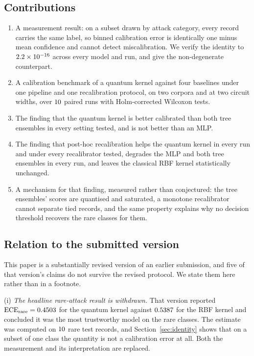 \documentclass[journal]{IEEEtran}
\begin{document}
\subsection*{Contributions}
\begin{enumerate}
  \item A measurement result: on a subset drawn by attack category, every
        record carries the same label, so binned calibration error is
        identically one minus mean confidence and cannot detect
        miscalibration. We verify the identity to $2.2\times10^{-16}$ across
        every model and run, and give the non-degenerate counterpart.
  \item A calibration benchmark of a quantum kernel against four baselines
        under one pipeline and one recalibration protocol, on two corpora and
        at two circuit widths, over $10$ paired runs with
        Holm-corrected Wilcoxon tests.
  \item The finding that the quantum kernel is better calibrated than both
        tree ensembles in every setting tested, and is not better than an
        MLP.
  \item The finding that post-hoc recalibration helps the quantum kernel in
        every run and under every recalibrator tested, degrades the MLP and
        both tree ensembles in every run, and leaves the classical RBF
        kernel statistically unchanged.
  \item A mechanism for that finding, measured rather than conjectured: the
        tree ensembles' scores are quantised and saturated, a monotone
        recalibrator cannot separate tied records, and the same property
        explains why no decision threshold recovers the rare classes for
        them.
\end{enumerate}

\subsection*{Relation to the submitted version}
This paper is a substantially revised version of an earlier submission, and
five of that version's claims do not survive the revised protocol. We state
them here rather than in a footnote.

(i) \emph{The headline rare-attack result is withdrawn.} That version
reported $\mathrm{ECE}_{\text{rare}}=0.4503$ for the quantum kernel
against $0.5387$ for the RBF kernel and concluded it was the most
trustworthy model on the rare classes. The estimate was computed on
$10$ rare test records, and
Section~\ref{sec:identity} shows that on a subset of one class the quantity
is not a calibration error at all. Both the measurement and its
interpretation are replaced.
\end{document}

